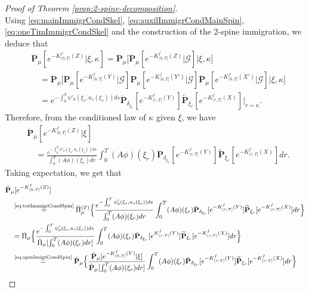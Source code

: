 \documentclass[UTF8]{pkuthss}
\theoremstyle{plain}
\theoremstyle{definition}
\numberwithin{equation}{section}
\begin{document}
\begin{proof}[Proof of Theorem \ref{prop:2-spine-decomposition}]
\begin{equation}
\end{equation}
	Using \eqref{eq:mainImmigrCondSkel}, \eqref{eq:auxilImmigrCondMainSpin}, \eqref{eq:oneTimImmigrCondSkel} and the construction of the 2-spine immigration, we deduce that
\begin{align}
	&\ddot {\mathbf P}_\mu[e^{-K^f_{(0, T]}(Z)}|\xi,\kappa]
	=\ddot {\mathbf P}_\mu\big[ \ddot {\mathbf P}_\mu[e^{-K^f_{(0, T]}(Z)}|\mathscr G ] \big | \xi,\kappa\big]\\
	&\quad=\ddot {\mathbf P}_\mu\Big[ \ddot {\mathbf P}_\mu[e^{-K^f_{(0, T]}(Y)}|\mathscr G ] \ddot {\mathbf P}_\mu[e^{-K^f_{(0, T]}(Y')}|\mathscr G ] \ddot {\mathbf P}_\mu[e^{-K^f_{(0, T]}(X')}|\mathscr G ] \Big | \xi,\kappa\Big]\\
	&\quad=e^{-\int_0^T\psi'_0(\xi_s,u_s(\xi_s))ds}\dot {\mathbf P}_{\delta_{\xi_r}}[ e^{-K^f_{(r, T]}(Y)}]\widetilde{\mathbf P}_{\xi_r}[e^{-K^f_{(r, T]}(X)}]\big |_{r=\kappa}.
\end{align}
	Therefore, from the conditioned law of $\kappa$ given $\xi$, we have
\begin{align}\label{eq:totImmigrCondSpin}
	&\ddot {\mathbf P}_\mu[e^{-K^f_{(0, T]}(Z)}|\xi]\\
	&\quad = \frac{e^{-\int_0^T\psi'_0(\xi_s,u_s(\xi_s))ds}}{\int_0^T (A\phi)(\xi_r)dr}\int_0^T  (A\phi)(\xi_r)\dot {\mathbf P}_{\delta_{\xi_r}}[ e^{-K^f_{(r, T]}(Y)}]\widetilde{\mathbf P}_{\xi_r}[e^{-K^f_{(r, T]}(X)}] dr.
\end{align}
	Taking expectation, we get that
\begin{align}
	&\ddot {\mathbf P}_\mu[e^{-K^f_{(0,T]}(Z)}]\\
	&\quad \overset{\text{\eqref{eq:totImmigrCondSpin}}}{=}\ddot {\Pi}_{\mu}^{(T)}\Big\{ \frac{e^{-\int_0^T\psi'_0(\xi_s,u_s(\xi_s))ds}}{\int_0^T (A\phi)(\xi_r)dr}\int_0^T  (A\phi)(\xi_r)\dot {\mathbf P}_{\delta_{\xi_r}}[ e^{-K^f_{(r, T]}(Y)}]\widetilde{\mathbf P}_{\xi_r}[e^{-K^f_{(r, T]}(X)}] dr\Big\}\\
	&\quad= \dot{\Pi}_{\mu}
	\Big\{ \frac{e^{-\int_0^T\psi'_0(\xi_s,u_s(\xi_s))ds}}{\dot{\Pi}_{\mu}[\int_0^T (A\phi)(\xi_r)dr]}\int_0^T  (A\phi)(\xi_r)\dot {\mathbf P}_{\delta_{\xi_r}}[ e^{K^f_{(r, T]}(Y)}]\widetilde{\mathbf P}_{\xi_r}[e^{-K^f_{(r, T]}(X)}] dr\Big\}\\
	&\quad \overset{\text{\eqref{eq:spinImigrCondSpin}}}{=} \dot{\mathbf P}_{\mu}\Big\{ \frac{\dot {\mathbf P}_\mu[e^{-K^f_{(0,T]}(Y)}|\xi]}{\dot{\mathbf P}_{\mu}[\int_0^T (A\phi)(\xi_r)dr]}\int_0^T  (A\phi)(\xi_r)\dot {\mathbf P}_{\delta_{\xi_r}}[ e^{-K^f_{(r, T]}(Y)}]\widetilde{\mathbf P}_{\xi_r}[e^{-K^f_{(r, T]}(X)}] dr\Big\}\\

\end{align}
\end{proof}
\end{document}
